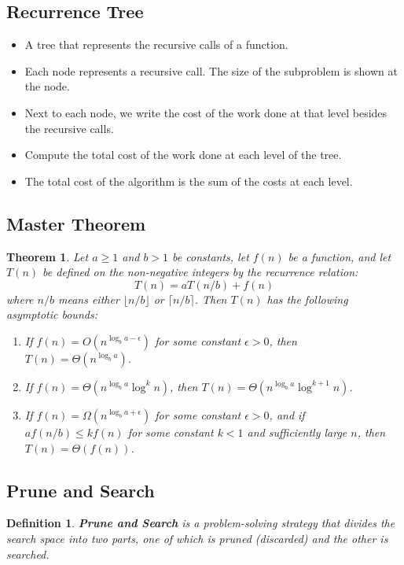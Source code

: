 \documentclass[11pt,fleqn]{article}
\newtheorem*{theorem}{Theorem}
\newtheorem*{definition}{Definition}
\begin{document}
\subsection{Recurrence Tree}
\begin{itemize}
    \item A tree that represents the recursive calls of a function.
    \item Each node represents a recursive call. The size of the subproblem is shown at the node.
    \item Next to each node, we write the cost of the work done at that level besides the recursive calls.
    \item Compute the total cost of the work done at each level of the tree.
    \item The total cost of the algorithm is the sum of the costs at each level.
\end{itemize}

\subsection{Master Theorem}
\begin{theorem}
    Let $a \geq 1$ and $b > 1$ be constants, let $f(n)$ be a function, and let $T(n)$ be defined on the non-negative integers by the recurrence relation: \[
        T(n) = aT(n/b) + f(n)
    \]
    where $n/b$ means either $\lfloor n/b \rfloor$ or $\lceil n/b \rceil$. Then $T(n)$ has the following asymptotic bounds: \begin{enumerate}
        \item If $f(n) = O(n^{\log_b a - \epsilon})$ for some constant $\epsilon > 0$, then $T(n) = \Theta(n^{\log_b a})$.
        \item If $f(n) = \Theta(n^{\log_b a} \log^k n)$, then $T(n) = \Theta(n^{\log_b a} \log^{k+1} n)$.
        \item If $f(n) = \Omega(n^{\log_b a + \epsilon})$ for some constant $\epsilon > 0$, and if $a f(n/b) \leq k f(n)$ for some constant $k < 1$ and sufficiently large $n$, then $T(n) = \Theta(f(n))$.
    \end{enumerate}
\end{theorem}

\subsection{Prune and Search}

\begin{definition}
    \textbf{Prune and Search} is a problem-solving strategy that divides the search space into two parts, one of which is pruned (discarded) and the other is searched.
\end{definition}
\end{document}
